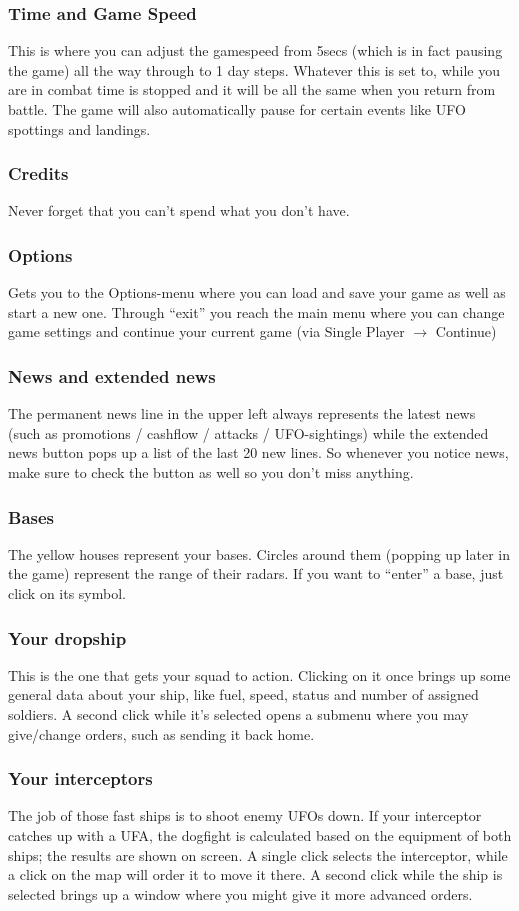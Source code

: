 \subsubsection{Time and Game Speed}
This is where you can adjust the gamespeed from 5secs (which is in fact pausing the game) all the way through to 1 day steps. Whatever this is set to, while you are in combat time is stopped and it will be all the same when you return from battle.  The game will also automatically pause for certain events like UFO spottings and landings.
\subsubsection{Credits}
Never forget that you can't spend what you don't have.
\subsubsection{Options}
Gets you to the Options-menu where you can load and save your game as well as start a new one.
Through ``exit'' you reach the main menu where you can change game settings and continue your current game (via Single Player $\rightarrow$ Continue)
\subsubsection{News and extended news}
The permanent news line in the upper left always represents the latest news (such as promotions / cashflow / attacks / UFO-sightings) while the extended news button pops up a list of the last 20 new lines. So whenever you notice news, make sure to check the button as well so you don't miss anything. 
\subsubsection{Bases}
The yellow houses represent your bases. Circles around them (popping up later in the game) represent the range of their radars. If you want to ``enter'' a base, just click on its symbol.
\subsubsection{Your dropship}
This is the one that gets your squad to action. Clicking on it once brings up some general data about your ship, like fuel, speed, status and number of assigned soldiers. A second click while it's selected opens a submenu where you may give/change orders, such as sending it back home.
\subsubsection{Your interceptors}
The job of those fast ships is to shoot enemy UFOs down. If your interceptor catches up with a UFA, the dogfight is calculated based on the equipment of both ships; the results are shown on screen. A single click selects the interceptor, while a click on the map will order it to move it there. A second click while the ship is selected brings up a window where you might give it more advanced orders.
